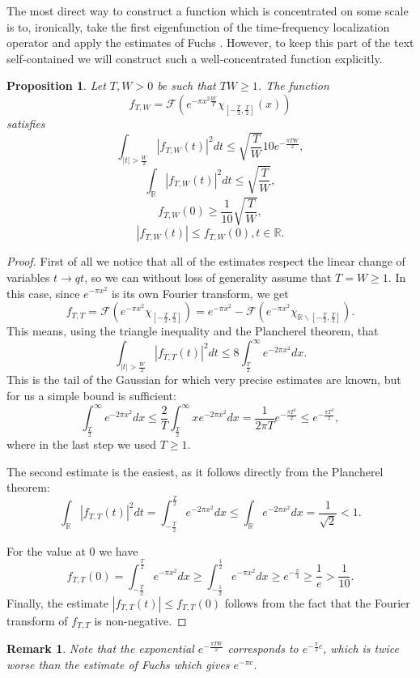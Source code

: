 \documentclass[12pt]{amsart}
\numberwithin{equation}{section}
\newcommand{\R}{\mathbb{R}}
\newcommand{\F}{\mathcal{F}}
\newtheorem{proposition}[Thm]{Proposition}
\newtheorem{remark}[Thm]{Remark}
\begin{document}
The most direct way to construct a function which is concentrated on some scale is to, ironically, take the first eigenfunction of the time-frequency localization operator and apply the estimates of Fuchs \cite{Fuc}. However, to keep this part of the text self-contained we will construct such a well-concentrated function explicitly.
\begin{proposition}\label{function prop}
Let $T, W>0$ be such that $TW \ge 1$. The function $$f_{T, W} =\F \left(e^{-\pi x^2 \frac{W}{T}}\chi_{[-\frac{T}{2},\frac{T}{2}]}(x)\right)$$ satisfies
$$\int_{|t| >\frac{W}{2}} |f_{T,W}(t)|^2dt \le \sqrt{\frac{T}{W}}10e^{-\frac{\pi TW}{2}},$$
$$\int_{\R} |f_{T,W}(t)|^2dt\le \sqrt{\frac{T}{W}},$$
$$f_{T, W}(0)\ge \frac{1}{10}\sqrt{\frac{T}{W}},$$
$$|f_{T,W}(t)|\le f_{T,W}(0), t\in\R.$$
\end{proposition}
\begin{proof}
First of all we notice that all of the estimates respect the linear change of variables $t\to qt$, so we can without loss of generality assume that $T = W\ge 1$. In this case, since $e^{-\pi x^2}$ is its own Fourier transform, we get
 $$f_{T,T} = \F \left(e^{-\pi x^2} \chi_{[-\frac{T}{2},\frac{T}{2}]}\right) = e^{-\pi x^2} - \F \left(e^{-\pi x^2} \chi_{\R\backslash [-\frac{T}{2},\frac{T}{2}]}\right).$$
This means, using the triangle inequality and the Plancherel theorem, that 
$$\int_{|t| > \frac{W}{2}} |f_{T, T}(t)|^2 dt \le 8\int_{\frac{T}{2}}^\infty e^{-2\pi x^2}dx.$$
This is the tail of the Gaussian for which very precise estimates are known, but for us a simple bound is sufficient:
$$\int_{\frac{T}{2}}^\infty e^{-2\pi x^2}dx \le \frac{2}{T}\int_{\frac{T}{2}}^\infty xe^{-2 \pi x^2}dx = \frac{1}{2\pi T}e^{-\frac{\pi T^2}{2}} \le e^{-\frac{\pi T^2}{2}},$$
where in the last step we used $T \ge 1$.

The second estimate is the easiest, as it follows directly from the Plancherel theorem:
$$\int_\R |f_{T,T}(t)|^2dt = \int_{-\frac{T}{2}}^{\frac{T}{2}} e^{-2\pi x^2}dx \le \int_\R e^{-2\pi x^2}dx =\frac{1}{\sqrt{2}} < 1.$$

For the value at $0$ we have
$$f_{T,T}(0) = \int_{-\frac{T}{2}}^{\frac{T}{2}}e^{-\pi x^2}dx \ge \int_{-\frac{1}{2}}^{\frac{1}{2}}e^{-\pi x^2}dx \ge e^{-\frac{\pi}{4}} \ge \frac{1}{e} > \frac{1}{10}.$$
Finally, the estimate $|f_{T,T}(t)|\le f_{T,T}(0)$ follows from the fact that the Fourier transform of $f_{T,T}$ is non-negative.
\end{proof}
\begin{remark}
Note that the exponential $e^{-\frac{\pi TW}{2}}$ corresponds to $e^{-\frac{\pi}{2}c}$, which is twice worse than the estimate of Fuchs which gives $e^{-\pi c}$.
\end{remark}
\end{document}
